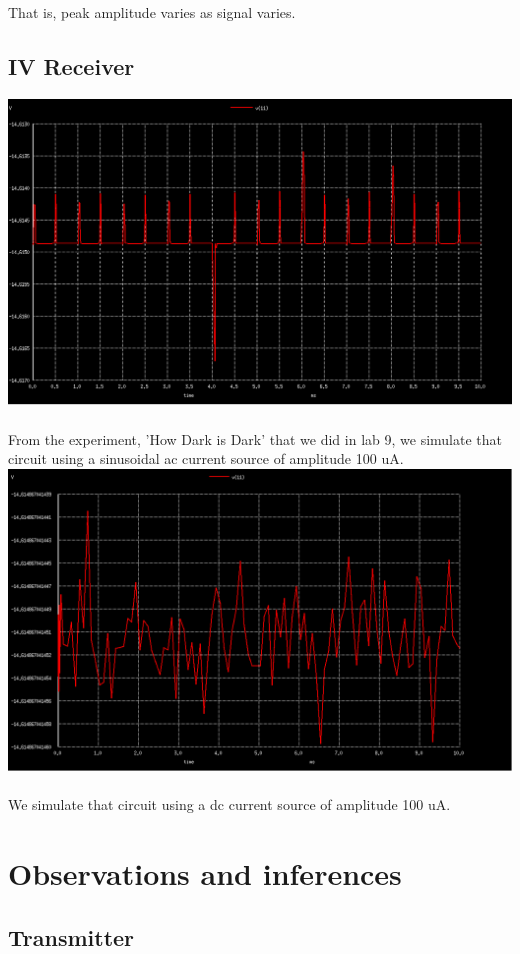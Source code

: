 \documentclass[12pt]{article}
\begin{document}
That is, peak amplitude varies as signal varies.

\subsection{IV Receiver}
\includegraphics[scale=0.3]{ir.png} \\ \\
From the experiment, 'How Dark is Dark' that we did in lab 9, we simulate that circuit using a sinusoidal ac current source of amplitude 100 uA. \\
\includegraphics[scale=0.3]{irdc.png} \\ \\
We simulate that circuit using a dc current source of amplitude 100 uA. \\
\section{Observations and inferences} 
\subsection{Transmitter}
\end{document}
